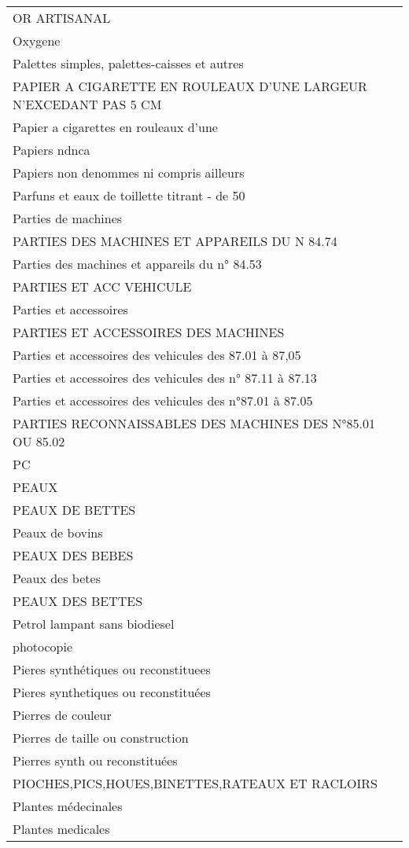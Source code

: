 \documentclass[
]{book}
\begin{document}
\begin{longtable}[t]{l}
OR ARTISANAL\\
Oxygene\\
Palettes simples, palettes-caisses et autres\\
\addlinespace
PAPIER A CIGARETTE EN ROULEAUX D'UNE LARGEUR N'EXCEDANT PAS 5 CM\\
Papier a cigarettes en rouleaux d'une\\
Papiers ndnca\\
Papiers non denommes ni compris ailleurs\\
Parfuns et eaux de toillette titrant - de 50\\
\addlinespace
Parties de machines\\
PARTIES DES MACHINES ET APPAREILS DU N 84.74\\
Parties des machines et appareils du n° 84.53\\
PARTIES ET ACC VEHICULE\\
Parties et accessoires\\
\addlinespace
PARTIES ET ACCESSOIRES DES MACHINES\\
Parties et accessoires des vehicules  des 87.01 à 87,05\\
Parties et accessoires des vehicules des n° 87.11 à 87.13\\
Parties et accessoires des vehicules des n°87.01 à 87.05\\
PARTIES RECONNAISSABLES DES MACHINES DES N°85.01 OU 85.02\\
\addlinespace
PC\\
PEAUX\\
PEAUX DE BETTES\\
Peaux de bovins\\
PEAUX DES BEBES\\
\addlinespace
Peaux des betes\\
PEAUX DES BETTES\\
Petrol lampant sans biodiesel\\
photocopie\\
Pieres synthétiques ou reconstituees\\
\addlinespace
Pieres synthetiques ou reconstituées\\
Pierres de couleur\\
Pierres de taille ou construction\\
Pierres synth ou reconstituées\\
PIOCHES,PICS,HOUES,BINETTES,RATEAUX ET RACLOIRS\\
\addlinespace
Plantes médecinales\\
Plantes medicales\\

\end{longtable}
\end{document}
